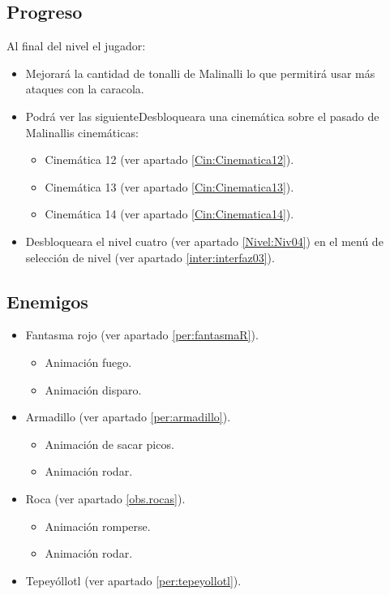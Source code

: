 	\subsection{Progreso}
Al final del nivel el jugador:
\begin{itemize}
	\item Mejorará la cantidad de tonalli de Malinalli lo que permitirá usar más ataques con la caracola.
	\item Podrá ver las siguienteDesbloqueara una cinemática sobre el pasado de Malinallis cinemáticas: 
		\begin{itemize}
			\item Cinemática 12 (ver apartado \ref{Cin:Cinematica12}).
			\item Cinemática 13 (ver apartado \ref{Cin:Cinematica13}).
			\item Cinemática 14 (ver apartado \ref{Cin:Cinematica14}).
		\end{itemize}
	\item Desbloqueara el nivel cuatro (ver apartado \ref{Nivel:Niv04}) en el menú de selección de nivel (ver apartado \ref{inter:interfaz03}).
\end{itemize} 
	\subsection{Enemigos}
\begin{itemize}
	\item 	Fantasma rojo (ver apartado \ref{per:fantasmaR}).
		\begin{itemize}
				\item Animación fuego.
				\item Animación disparo.
			\end{itemize}
	\item Armadillo (ver apartado \ref{per:armadillo}).
		\begin{itemize}
			\item Animación de sacar picos.
			\item Animación rodar. 
		\end{itemize}
	\item Roca (ver apartado \ref{obs.rocas}).
		\begin{itemize}
			\item Animación romperse.
			\item Animación rodar.
		\end{itemize}
	\item Tepeyóllotl (ver apartado \ref{per:tepeyollotl}). 

\end{itemize}

